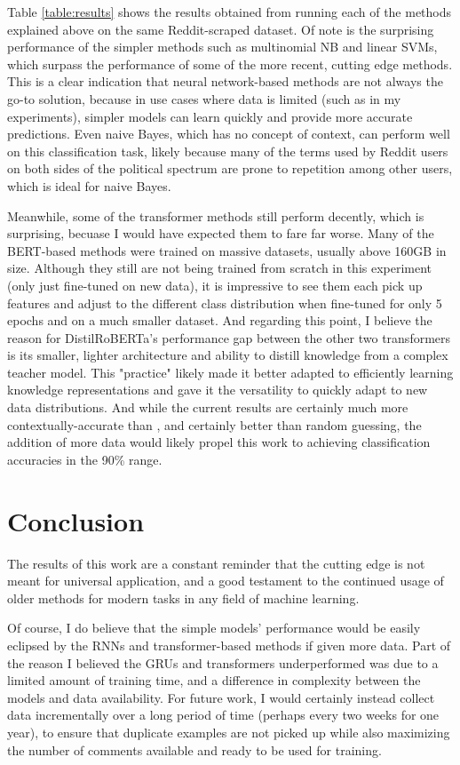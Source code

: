 \documentclass[11pt,a4paper]{article}
\begin{document}
Table \ref{table:results} shows the results obtained from running each of the methods explained above on the same Reddit-scraped dataset. Of note is the surprising performance of the simpler methods such as multinomial NB and linear SVMs, which surpass the performance of some of the more recent, cutting edge methods. This is a clear indication that neural network-based methods are not always the go-to solution, because in use cases where data is limited (such as in my experiments), simpler models can learn quickly and provide more accurate predictions. Even naive Bayes, which has no concept of context, can perform well on this classification task, likely because many of the terms used by Reddit users on both sides of the political spectrum are prone to repetition among other users, which is ideal for naive Bayes.

Meanwhile, some of the transformer methods still perform decently, which is surprising, becuase I would have expected them to fare far worse. Many of the BERT-based methods were trained on massive datasets, usually above 160GB in size. Although they still are not being trained from scratch in this experiment (only just fine-tuned on new data), it is impressive to see them each pick up features and adjust to the different class distribution when fine-tuned for only 5 epochs and on a much smaller dataset. And regarding this point, I believe the reason for DistilRoBERTa's performance gap between the other two transformers is its smaller, lighter architecture and ability to distill knowledge from a complex teacher model. This "practice" likely made it better adapted to efficiently learning knowledge representations and gave it the versatility to quickly adapt to new data distributions. And while the current results are certainly much more contextually-accurate than \cite{reddit-stance}, and certainly better than random guessing, the addition of more data would likely propel this work to achieving classification accuracies in the 90\% range.

\section{Conclusion}

The results of this work are a constant reminder that the cutting edge is not meant for universal application, and a good testament to the continued usage of older methods for modern tasks in any field of machine learning.

Of course, I do believe that the simple models' performance would be easily eclipsed by the RNNs and transformer-based methods if given more data. Part of the reason I believed the GRUs and transformers underperformed was due to a limited amount of training time, and a difference in complexity between the models and data availability. For future work, I would certainly instead collect data incrementally over a long period of time (perhaps every two weeks for one year), to ensure that duplicate examples are not picked up while also maximizing the number of comments available and ready to be used for training.
\end{document}
